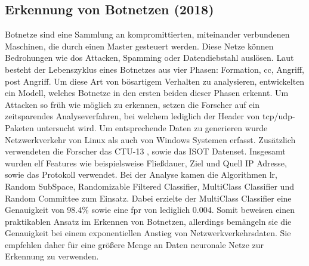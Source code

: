 \documentclass[
    12pt, %
    DIV10,
    ngerman, %
    a4paper, %
    oneside, %
    titlepage, %
    parskip=half, %
    headings=normal, %
    listof=totoc, %
    bibliography=totoc, %
    index=totoc, %
    captions=tableheading, %
    final %
]{scrreprt}
\begin{document}
\subsection{Erkennung von Botnetzen (2018)}\label{ctu}
Botnetze sind eine Sammlung an kompromittierten, miteinander verbundenen Maschinen, die durch einen Master gesteuert werden. Diese Netze können Bedrohungen wie \ac{dos} Attacken, Spamming oder Datendiebstahl auslösen. Laut \textcite{leonard2009framework} besteht der Lebenszyklus eines Botnetzes aus vier Phasen: Formation, \ac{cc}, Angriff, post Angriff. Um diese Art von bösartigem Verhalten zu analysieren, entwickelten \textcite{Mathur2018} ein Modell, welches Botnetze in den ersten beiden dieser Phasen erkennt. Um Attacken so früh wie möglich zu erkennen, setzen die Forscher auf ein zeitsparendes Analyseverfahren, bei welchem lediglich der Header von \ac{tcp}/\ac{udp}-Paketen untersucht wird. Um entsprechende Daten zu generieren wurde Netzwerkverkehr von Linux als auch von Windows Systemen erfasst. Zusätzlich verwendeten die Forscher das CTU-13 \parencite{garcia2014empirical}, sowie das ISOT \parencite{isot} Datenset. Insgesamt wurden elf Features wie beispielsweise Flie{\ss}dauer, Ziel und Quell IP Adresse, sowie das Protokoll verwendet. Bei der Analyse kamen die Algorithmen \ac{lr}, Random SubSpace, Randomizable Filtered Classifier, MultiClass Classifier und Random Committee zum Einsatz. Dabei erzielte der MultiClass Classifier eine Genauigkeit von 98.4\% sowie eine \ac{fpr} von lediglich 0.004. Somit beweisen \textcite{Mathur2018} einen praktikablen Ansatz im Erkennen von Botnetzen, allerdings bemängeln sie die Genauigkeit bei einem exponentiellen Anstieg von Netzwerkverkehrsdaten. Sie empfehlen daher für eine grö{\ss}ere Menge an Daten neuronale Netze zur Erkennung zu verwenden.
%
\end{document}
